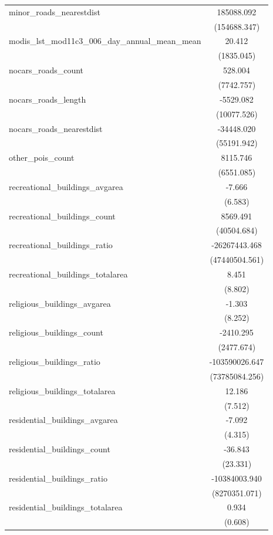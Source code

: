 \begin{table}[!htbp]
\begin{tabular}{@{\extracolsep{5pt}}lc}
 minor_roads_nearestdist & 185088.092$^{}$ \\
  & (154688.347) \\
 modis_lst_mod11c3_006_day_annual_mean_mean & 20.412$^{}$ \\
  & (1835.045) \\
 nocars_roads_count & 528.004$^{}$ \\
  & (7742.757) \\
 nocars_roads_length & -5529.082$^{}$ \\
  & (10077.526) \\
 nocars_roads_nearestdist & -34448.020$^{}$ \\
  & (55191.942) \\
 other_pois_count & 8115.746$^{}$ \\
  & (6551.085) \\
 recreational_buildings_avgarea & -7.666$^{}$ \\
  & (6.583) \\
 recreational_buildings_count & 8569.491$^{}$ \\
  & (40504.684) \\
 recreational_buildings_ratio & -26267443.468$^{}$ \\
  & (47440504.561) \\
 recreational_buildings_totalarea & 8.451$^{}$ \\
  & (8.802) \\
 religious_buildings_avgarea & -1.303$^{}$ \\
  & (8.252) \\
 religious_buildings_count & -2410.295$^{}$ \\
  & (2477.674) \\
 religious_buildings_ratio & -103590026.647$^{}$ \\
  & (73785084.256) \\
 religious_buildings_totalarea & 12.186$^{}$ \\
  & (7.512) \\
 residential_buildings_avgarea & -7.092$^{}$ \\
  & (4.315) \\
 residential_buildings_count & -36.843$^{}$ \\
  & (23.331) \\
 residential_buildings_ratio & -10384003.940$^{}$ \\
  & (8270351.071) \\
 residential_buildings_totalarea & 0.934$^{}$ \\
  & (0.608) \\

\end{tabular}
\end{table}

